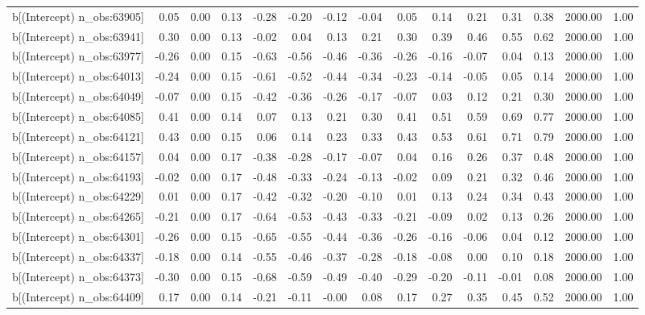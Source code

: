 \begin{table}[ht]
\begin{tabular}{rrrrrrrrrrrrrrr}
  b[(Intercept) n\_obs:63905] & 0.05 & 0.00 & 0.13 & -0.28 & -0.20 & -0.12 & -0.04 & 0.05 & 0.14 & 0.21 & 0.31 & 0.38 & 2000.00 & 1.00 \\ 
  b[(Intercept) n\_obs:63941] & 0.30 & 0.00 & 0.13 & -0.02 & 0.04 & 0.13 & 0.21 & 0.30 & 0.39 & 0.46 & 0.55 & 0.62 & 2000.00 & 1.00 \\ 
  b[(Intercept) n\_obs:63977] & -0.26 & 0.00 & 0.15 & -0.63 & -0.56 & -0.46 & -0.36 & -0.26 & -0.16 & -0.07 & 0.04 & 0.13 & 2000.00 & 1.00 \\ 
  b[(Intercept) n\_obs:64013] & -0.24 & 0.00 & 0.15 & -0.61 & -0.52 & -0.44 & -0.34 & -0.23 & -0.14 & -0.05 & 0.05 & 0.14 & 2000.00 & 1.00 \\ 
  b[(Intercept) n\_obs:64049] & -0.07 & 0.00 & 0.15 & -0.42 & -0.36 & -0.26 & -0.17 & -0.07 & 0.03 & 0.12 & 0.21 & 0.30 & 2000.00 & 1.00 \\ 
  b[(Intercept) n\_obs:64085] & 0.41 & 0.00 & 0.14 & 0.07 & 0.13 & 0.21 & 0.30 & 0.41 & 0.51 & 0.59 & 0.69 & 0.77 & 2000.00 & 1.00 \\ 
  b[(Intercept) n\_obs:64121] & 0.43 & 0.00 & 0.15 & 0.06 & 0.14 & 0.23 & 0.33 & 0.43 & 0.53 & 0.61 & 0.71 & 0.79 & 2000.00 & 1.00 \\ 
  b[(Intercept) n\_obs:64157] & 0.04 & 0.00 & 0.17 & -0.38 & -0.28 & -0.17 & -0.07 & 0.04 & 0.16 & 0.26 & 0.37 & 0.48 & 2000.00 & 1.00 \\ 
  b[(Intercept) n\_obs:64193] & -0.02 & 0.00 & 0.17 & -0.48 & -0.33 & -0.24 & -0.13 & -0.02 & 0.09 & 0.21 & 0.32 & 0.46 & 2000.00 & 1.00 \\ 
  b[(Intercept) n\_obs:64229] & 0.01 & 0.00 & 0.17 & -0.42 & -0.32 & -0.20 & -0.10 & 0.01 & 0.13 & 0.24 & 0.34 & 0.43 & 2000.00 & 1.00 \\ 
  b[(Intercept) n\_obs:64265] & -0.21 & 0.00 & 0.17 & -0.64 & -0.53 & -0.43 & -0.33 & -0.21 & -0.09 & 0.02 & 0.13 & 0.26 & 2000.00 & 1.00 \\ 
  b[(Intercept) n\_obs:64301] & -0.26 & 0.00 & 0.15 & -0.65 & -0.55 & -0.44 & -0.36 & -0.26 & -0.16 & -0.06 & 0.04 & 0.12 & 2000.00 & 1.00 \\ 
  b[(Intercept) n\_obs:64337] & -0.18 & 0.00 & 0.14 & -0.55 & -0.46 & -0.37 & -0.28 & -0.18 & -0.08 & 0.00 & 0.10 & 0.18 & 2000.00 & 1.00 \\ 
  b[(Intercept) n\_obs:64373] & -0.30 & 0.00 & 0.15 & -0.68 & -0.59 & -0.49 & -0.40 & -0.29 & -0.20 & -0.11 & -0.01 & 0.08 & 2000.00 & 1.00 \\ 
  b[(Intercept) n\_obs:64409] & 0.17 & 0.00 & 0.14 & -0.21 & -0.11 & -0.00 & 0.08 & 0.17 & 0.27 & 0.35 & 0.45 & 0.52 & 2000.00 & 1.00 \\ 

\end{tabular}
\end{table}
